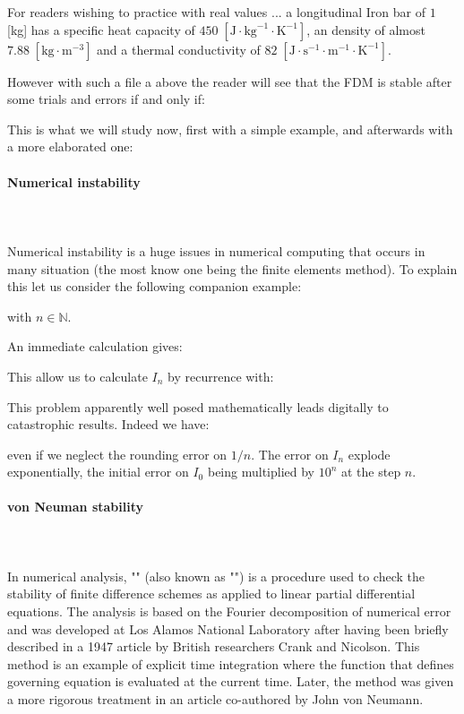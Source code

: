	For readers wishing to practice with real values ... a longitudinal Iron bar of $1$ [kg] has a specific heat capacity of $450\;[\text{J}\cdot\text{kg}^{-1}\cdot\text{K}^{-1}]$, an density of almost $7.88\;[\text{kg}\cdot \text{m}^{-3}]$ and a thermal conductivity of $82\;[\text{J}\cdot\text{s}^{-1}\cdot\text{m}^{-1}\cdot\text{K}^{-1}]$.
	
	However with such a file a above the reader will see that the FDM is stable   after some trials and errors if and only if:
	
	This is what we will study now, first with a simple example, and afterwards with a more elaborated one:
	
	\paragraph{Numerical instability}\mbox{}\\\\
	Numerical instability is a huge issues in numerical computing that occurs in many situation (the most know one being the finite elements method). To explain this let us consider the following companion example:
	
	with $n\in\mathbb{N}$.
	
	An immediate calculation gives:
	
	This allow us to calculate $I_n$ by recurrence with:
	
	This problem apparently well posed mathematically leads digitally to catastrophic results. Indeed we have:
	
	even if we neglect the rounding error on $1/n$. The error on $I_n$ explode exponentially, the initial error on $I_0$ being multiplied by $10^n$ at the step $n$.
	
	\paragraph{von Neuman stability}\mbox{}\\\\
	In numerical analysis, "" (also known as "") is a procedure used to check the stability of finite difference schemes as applied to linear partial differential equations. The analysis is based on the Fourier decomposition of numerical error and was developed at Los Alamos National Laboratory after having been briefly described in a 1947 article by British researchers Crank and Nicolson. This method is an example of explicit time integration where the function that defines governing equation is evaluated at the current time. Later, the method was given a more rigorous treatment in an article co-authored by John von Neumann.
	

